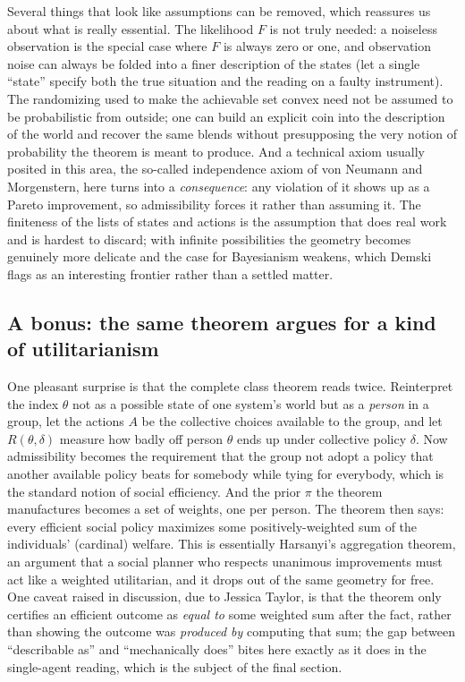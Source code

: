 \documentclass[10pt]{article}
\theoremstyle{definition}
\theoremstyle{remark}
\begin{document}
Several things that look like assumptions can be removed, which reassures us about what is really essential. The likelihood $F$ is not truly needed: a noiseless observation is the special case where $F$ is always zero or one, and observation noise can always be folded into a finer description of the states (let a single ``state'' specify both the true situation and the reading on a faulty instrument). The randomizing used to make the achievable set convex need not be assumed to be probabilistic from outside; one can build an explicit coin into the description of the world and recover the same blends without presupposing the very notion of probability the theorem is meant to produce. And a technical axiom usually posited in this area, the so-called independence axiom of von Neumann and Morgenstern, here turns into a \emph{consequence}: any violation of it shows up as a Pareto improvement, so admissibility forces it rather than assuming it. The finiteness of the lists of states and actions is the assumption that does real work and is hardest to discard; with infinite possibilities the geometry becomes genuinely more delicate and the case for Bayesianism weakens, which Demski flags as an interesting frontier rather than a settled matter.

\subsection{A bonus: the same theorem argues for a kind of utilitarianism}

One pleasant surprise is that the complete class theorem reads twice. Reinterpret the index $\theta$ not as a possible state of one system's world but as a \emph{person} in a group, let the actions $A$ be the collective choices available to the group, and let $R(\theta, \delta)$ measure how badly off person $\theta$ ends up under collective policy $\delta$. Now admissibility becomes the requirement that the group not adopt a policy that another available policy beats for somebody while tying for everybody, which is the standard notion of social efficiency. And the prior $\pi$ the theorem manufactures becomes a set of weights, one per person. The theorem then says: every efficient social policy maximizes some positively-weighted sum of the individuals' (cardinal) welfare. This is essentially Harsanyi's aggregation theorem, an argument that a social planner who respects unanimous improvements must act like a weighted utilitarian, and it drops out of the same geometry for free. One caveat raised in discussion, due to Jessica Taylor, is that the theorem only certifies an efficient outcome as \emph{equal to} some weighted sum after the fact, rather than showing the outcome was \emph{produced by} computing that sum; the gap between ``describable as'' and ``mechanically does'' bites here exactly as it does in the single-agent reading, which is the subject of the final section.
\end{document}
